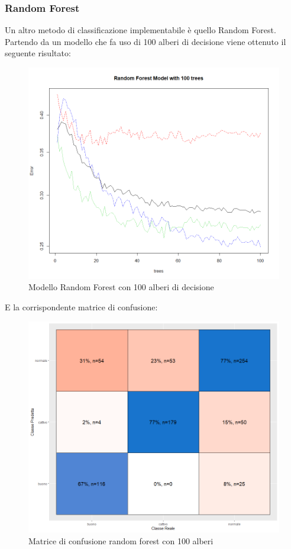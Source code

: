 \documentclass[12pt]{article}
\begin{document}
\subsubsection{Random Forest}
Un altro metodo di classificazione implementabile è quello Random Forest. Partendo da un modello che fa uso di 100 alberi di decisione viene ottenuto il seguente risultato:
\begin{figure}[!htb]
    \centering
    \includegraphics[width=1\textwidth]{immagini/100.png}
    \caption{Modello Random Forest con 100 alberi di decisione}
\end{figure}
\FloatBarrier
E la corrispondente matrice di confusione:
\begin{figure}[!htb]
    \centering
    \includegraphics[width=1\textwidth]{immagini/conf100.png}
    \caption{Matrice di confusione random forest con 100 alberi}
\end{figure}
\end{document}
